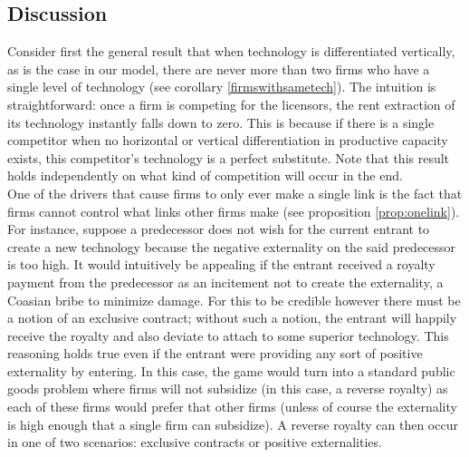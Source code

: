 \documentclass{article}
\begin{document}
\subsection{Discussion}
Consider first the general result that when technology is differentiated vertically, as is the case in our model, there are never more than two firms who have a single level of technology (see corollary \ref{firmswithsametech}). The intuition is straightforward: once a firm is competing for the licensors, the rent extraction of its technology instantly falls down to zero. This is because if there is a single competitor when no horizontal or vertical differentiation in productive capacity exists, this competitor's technology is a perfect substitute. Note that this result holds independently on what kind of competition will occur in the end. \\
\indent One of the drivers that cause firms to only ever make a single link is the fact that firms cannot control what links other firms make (see proposition \ref{prop:onelink}). For instance, suppose a predecessor does not wish for the current entrant to create a new technology because the negative externality on the said predecessor is too high. It would intuitively be appealing if the entrant received a royalty payment from the predecessor as an incitement not to create the externality, a Coasian bribe to minimize damage. For this to be credible however there must be a notion of an exclusive contract; without such a notion, the entrant will happily receive the royalty and also deviate to attach to some superior technology. This reasoning holds true even if the entrant were providing any sort of positive externality by entering. In this case, the game would turn into a standard public goods problem where firms will not subsidize (in this case, a reverse royalty) as each of these firms would prefer that other firms (unless of course the externality is high enough that a single firm can subsidize). A reverse royalty can then occur in one of two scenarios: exclusive contracts or positive externalities. \\
\end{document}
